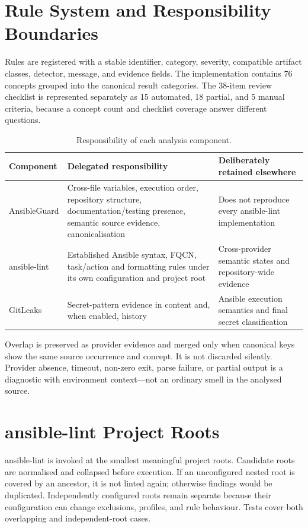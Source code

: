 \section{Rule System and Responsibility Boundaries}
Rules are registered with a stable identifier, category, severity, compatible
artifact classes, detector, message, and evidence fields. The implementation
contains 76 concepts grouped into the canonical result categories. The 38-item
review checklist is represented separately as 15 automated, 18 partial, and 5
manual criteria, because a concept count and checklist coverage answer
different questions.

\begin{table}[H]
\centering\small
\caption{Responsibility of each analysis component.}
\begin{tabularx}{\textwidth}{p{3cm}X X}
\toprule
Component & Delegated responsibility & Deliberately retained elsewhere \\
\midrule
AnsibleGuard & Cross-file variables, execution order, repository structure,
documentation/testing presence, semantic source evidence, canonicalisation &
Does not reproduce every ansible-lint implementation \\
ansible-lint & Established Ansible syntax, FQCN, task/action and formatting
rules under its own configuration and project root & Cross-provider semantic
states and repository-wide evidence \\
GitLeaks & Secret-pattern evidence in content and, when enabled, history &
Ansible execution semantics and final secret classification \\
\bottomrule
\end{tabularx}
\end{table}

Overlap is preserved as provider evidence and merged only when canonical keys
show the same source occurrence and concept. It is not discarded silently.
Provider absence, timeout, non-zero exit, parse failure, or partial output is a
diagnostic with environment context—not an ordinary smell in the analysed
source.

\section{ansible-lint Project Roots}
ansible-lint is invoked at the smallest meaningful project roots. Candidate
roots are normalised and collapsed before execution. If an unconfigured nested
root is covered by an ancestor, it is not linted again; otherwise findings
would be duplicated. Independently configured roots remain separate because
their configuration can change exclusions, profiles, and rule behaviour.
Tests cover both overlapping and independent-root cases.


